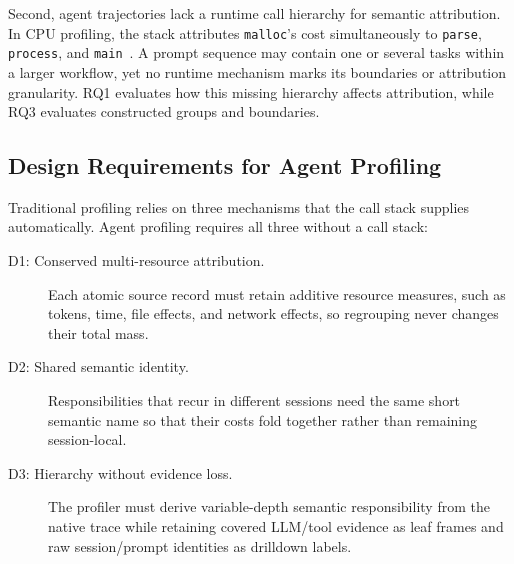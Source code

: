 \documentclass[letterpaper]{article}
\begin{document}
Second, agent trajectories lack a runtime call hierarchy for semantic attribution.
In CPU profiling, the stack attributes \texttt{malloc}'s cost simultaneously
to \texttt{parse}, \texttt{process}, and \texttt{main}~\cite{pprof,flamegraphs}.
A prompt sequence may contain one or several tasks within a larger workflow,
yet no runtime mechanism marks its boundaries or attribution granularity.
RQ1 evaluates how this missing hierarchy affects attribution, while RQ3
evaluates constructed groups and boundaries.

\subsection{Design Requirements for Agent Profiling}

Traditional profiling relies on three mechanisms that the call stack supplies automatically.
Agent profiling requires all three without a call stack:

\begin{description}
\item[D1: Conserved multi-resource attribution.]
Each atomic source record must retain additive resource measures, such as
tokens, time, file effects, and network effects, so regrouping never changes
their total mass.
\item[D2: Shared semantic identity.]
Responsibilities that recur in different sessions need the same short semantic
name so that their costs fold together rather than remaining session-local.
\item[D3: Hierarchy without evidence loss.]
The profiler must derive variable-depth semantic responsibility from the native
trace while retaining covered LLM/tool evidence as leaf frames and raw
session/prompt identities as drilldown labels.
\end{description}
\end{document}
